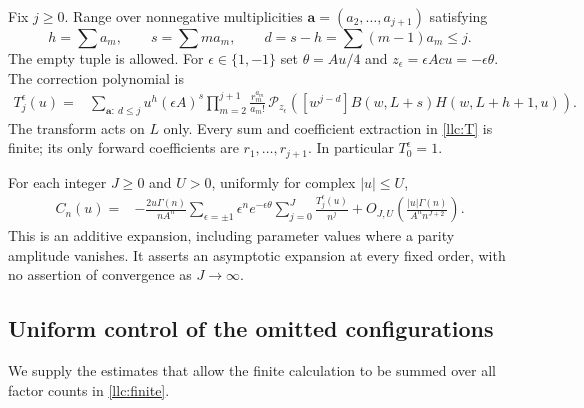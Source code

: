 Fix $j\ge0$. Range over nonnegative multiplicities
$\mathbf a=(a_2,\ldots,a_{j+1})$ satisfying
\[
 h=\sum a_m,\qquad s=\sum m a_m,\qquad
 d=s-h=\sum(m-1)a_m\le j.
\]
The empty tuple is allowed. For $\epsilon\in\{1,-1\}$ set
$\theta=Au/4$ and $z_\epsilon=\epsilon Acu=-\epsilon\theta$.
The correction polynomial is
\begin{equation}\label{llc:T}
 \begin{split}
 T_j^\epsilon(u)={}&\sum_{\mathbf a:\ d\le j}
 u^h(\epsilon A)^s\prod_{m=2}^{j+1}\frac{r_m^{a_m}}{a_m!}\,
 \mathcal P_{z_\epsilon}\!\left(
 [w^{j-d}]B(w,L+s)H(w,L+h+1,u)\right).
 \end{split}
\end{equation}
The transform acts on $L$ only. Every sum and coefficient extraction
in \eqref{llc:T} is finite; its only forward coefficients are
$r_1,\ldots,r_{j+1}$. In particular $T_0^\epsilon=1$.

\begin{theorem}\label{llc:all-orders}
For each integer $J\ge0$ and $U>0$, uniformly for complex $|u|\le U$,
\begin{equation}\label{llc:expansion}
 \begin{split}
 C_n(u)={}&-\frac{2u\Gamma(n)}{nA^n}
 \sum_{\epsilon=\pm1}\epsilon^n e^{-\epsilon\theta}
                  \sum_{j=0}^J\frac{T_j^\epsilon(u)}{n^j}
 +O_{J,U}\!\left(\frac{|u|\Gamma(n)}{A^n n^{J+2}}\right).
 \end{split}
\end{equation}
This is an additive expansion, including parameter values where a
parity amplitude vanishes. It asserts an asymptotic expansion at every
fixed order, with no assertion of convergence as $J\to\infty$.
\end{theorem}

\subsection{Uniform control of the omitted configurations}

We supply the estimates that allow the finite calculation to be summed
over all factor counts in \eqref{llc:finite}.

